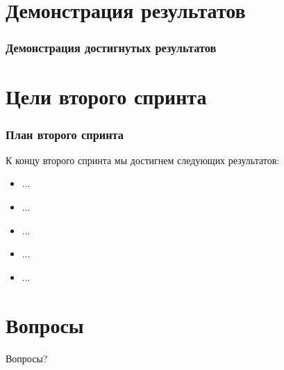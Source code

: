 \documentclass{beamer}
\begin{document}
\section{Демонстрация результатов}

\begin{frame}
\frametitle{Демонстрация достигнутых результатов}



\end{frame}

\section{Цели второго спринта}

\begin{frame}
\frametitle{План второго спринта}

К концу второго спринта мы достигнем следующих результатов:
\medskip
\begin{itemize}
\item ...
\item ...
\item ...
\item ...
\item ...
\end{itemize}

\end{frame}

\section{Вопросы}

\begin{frame}
\Huge{\centerline{Вопросы?}}
\end{frame}

\end{document}
